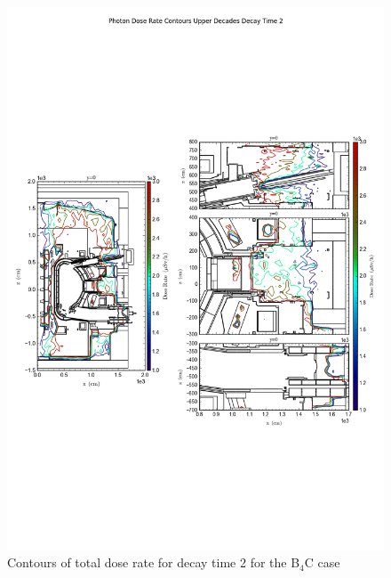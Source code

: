 \documentclass[12pt]{article}
\begin{document}
\begin{figure}[ht!]
\centering
\includegraphics[trim={0cm 8cm, 0cm 8cm},clip,scale=0.6]{../plots/final_model_with_b4c/Photon_Dose_Rate_Contours_Upper_Decades_Decay_Time_2.png}
\caption{Contours of total dose rate for decay time 2 for the B$_4$C case}
\label{fig:photons_dc2_b4c_contours}
\end{figure}
\newpage
\clearpage
\end{document}
